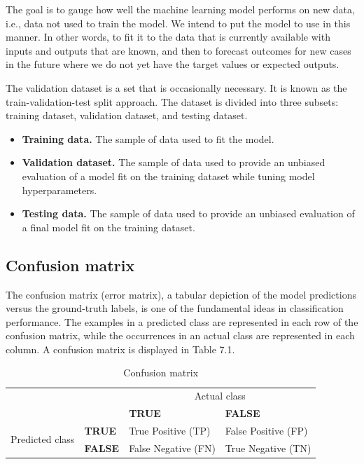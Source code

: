 The goal is to gauge how well the machine learning model performs on new data, i.e., data not used to train the model. We intend to put the model to use in this manner. In other words, to fit it to the data that is currently available with inputs and outputs that are known, and then to forecast outcomes for new cases in the future where we do not yet have the target values or expected outputs.

The validation dataset is a set that is occasionally necessary. It is known as the train-validation-test split approach. The dataset is divided into three subsets: training dataset, validation dataset, and testing dataset.

\begin{itemize}
	\item \textbf{Training data.} The sample of data used to fit the model.
	\item \textbf{Validation dataset.} The sample of data used to provide an unbiased evaluation of a model fit on the training dataset while tuning model hyperparameters.
	\item \textbf{Testing data.} The sample of data used to provide an unbiased evaluation of a final model fit on the training dataset.
\end{itemize}

\subsection{Confusion matrix}
\hspace{0.5cm}The confusion matrix (error matrix), a tabular depiction of the model predictions versus the ground-truth labels, is one of the fundamental ideas in classification performance. The examples in a predicted class are represented in each row of the confusion matrix, while the occurrences in an actual class are represented in each column.  A confusion matrix is
displayed in Table 7.1.

\begin{table}[h!]
	\begin{tabular}{llll}
													   &                            & \multicolumn{2}{c}{Actual class}                                                 \\ \cline{3-4} 
													   & \multicolumn{1}{l|}{}      & \multicolumn{1}{l|}{\textbf{TRUE}}                & \multicolumn{1}{l|}{\textbf{FALSE}}               \\ \cline{2-4} 
	\multicolumn{1}{c|}{\multirow{2}{*}{Predicted class}} & \multicolumn{1}{l|}{\textbf{TRUE}}  & \multicolumn{1}{l|}{True Positive (TP)}  & \multicolumn{1}{l|}{False Positive (FP)} \\ \cline{2-4} 
	\multicolumn{1}{c|}{}                              & \multicolumn{1}{l|}{\textbf{FALSE}} & \multicolumn{1}{l|}{False Negative (FN)} & \multicolumn{1}{l|}{True Negative (TN)}  \\ \cline{2-4} 
	\end{tabular}
	\caption{\label{demo-table} Confusion matrix}
\end{table} 

